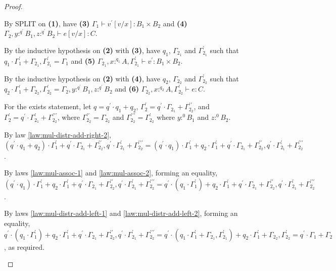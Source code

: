 \documentclass[acmsmall,screen,nonacm]{acmart}
\newcommand{\tee}{\vdash}
\begin{document}
\begin{proof}
\begin{description}
    By SPLIT on \textbf{(1)}, have \textbf{(3)} $\Gamma_1 \tee v^\prime[v/x] : B_1 \times B_2$ and \textbf{(4)} $\Gamma_2, y :^{q^\prime} B_1, z :^{q^\prime} B_2 \tee e[v/x] : C$.

    By the inductive hypothesis on \textbf{(2)} with \textbf{(3)}, have $q_1$, $\Gamma_{2_1}$ and $\Gamma_{2_1}^\prime$ such that $q_1 \cdot \Gamma_1^\prime + \Gamma_{2_1}, \Gamma_{2_1}^\prime = \Gamma_1$ and \textbf{(5)} $\Gamma_{2_1}, x :^{q_1} A, \Gamma_{2_1}^\prime \tee v^\prime : B_1 \times B_2$.
    
    By the inductive hypothesis on \textbf{(2)} with \textbf{(4)}, have $q_2$, $\Gamma_{2_2}$ and $\Gamma_{2_2}^\prime$ such that $q_2 \cdot \Gamma_1^\prime + \Gamma_{2_2}, \Gamma_{2_2}^\prime = \Gamma_2, y :^{q^\prime} B_1, z :^{q^\prime} B_2$ and \textbf{(6)} $\Gamma_{2_2}, x :^{q_2} A, \Gamma_{2_2}^\prime \tee e : C$.

    For the exists statement, let $q = q^\prime \cdot q_1 + q_2$, $\Gamma_2^\prime = q^\prime \cdot \Gamma_{2_1} + \Gamma_{2_2}^{\prime\prime}$, and $\Gamma_2^\prime = q^\prime \cdot \Gamma_{2_1}^\prime + \Gamma_{2_2}^{\prime\prime\prime}$, where $\Gamma_{2_2}^{\prime\prime} = \Gamma_{2_2}$ and $\Gamma_{2_2}^{\prime\prime\prime} = \Gamma_{2_2}^\prime$ where $y :^0 B_1$ and $z :^0 B_2$.

    By law \ref{law:mul-distr-add-right-2}, $(q^\prime \cdot q_1 + q_2) \cdot \Gamma_1^\prime + q^\prime \cdot \Gamma_{2_1} + \Gamma_{2_2}^{\prime\prime}, q^\prime \cdot \Gamma_{2_1}^\prime + \Gamma_{2_2}^{\prime\prime\prime} = (q^\prime \cdot q_1) \cdot \Gamma_1^\prime + q_2 \cdot \Gamma_1^\prime + q^\prime \cdot \Gamma_{2_1} + \Gamma_{2_2}^{\prime\prime}, q^\prime \cdot \Gamma_{2_1}^\prime + \Gamma_{2_2}^{\prime\prime\prime}$.
    
    By laws \ref{law:mul-assoc-1} and \ref{law:mul-assoc-2}, forming an equality, $(q^\prime \cdot q_1) \cdot \Gamma_1^\prime + q_2 \cdot \Gamma_1^\prime + q^\prime \cdot \Gamma_{2_1} + \Gamma_{2_2}^{\prime\prime}, q^\prime \cdot \Gamma_{2_1}^\prime + \Gamma_{2_2}^{\prime\prime\prime} = q^\prime \cdot (q_1 \cdot \Gamma_1^\prime) + q_2 \cdot \Gamma_1^\prime + q^\prime \cdot \Gamma_{2_1} + \Gamma_{2_2}^{\prime\prime}, q^\prime \cdot \Gamma_{2_1}^\prime + \Gamma_{2_2}^{\prime\prime\prime}$. 
    
    By laws \ref{law:mul-distr-add-left-1} and \ref{law:mul-distr-add-left-2}, forming an equality, $q^\prime \cdot (q_1 \cdot \Gamma_1^\prime) + q_2 \cdot \Gamma_1^\prime + q^\prime \cdot \Gamma_{2_1} + \Gamma_{2_2}^{\prime\prime}, q^\prime \cdot \Gamma_{2_1}^\prime + \Gamma_{2_2}^{\prime\prime\prime} = q^\prime \cdot (q_1 \cdot \Gamma_1^\prime + \Gamma_{2_1}, \Gamma_{2_1}^\prime) + q_2 \cdot \Gamma_1^\prime + \Gamma_{2_2}, \Gamma_{2_2}^\prime = q^\prime \cdot \Gamma_1 + \Gamma_2$, as required.
    

\end{description}
\end{proof}
\end{document}
